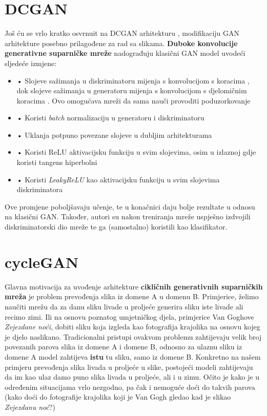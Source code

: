 \section{DCGAN}

Još ću se vrlo kratko osvrnuit na DCGAN arhitekturu \citep{dcgan}, modifikaciju GAN arhitekture posebno prilagođene za rad sa slikama. \textbf{Duboke konvolucije generativne suparničke mreže}  nadograđuju klasični GAN model uvodeći sljedeće izmjene:
\begin{itemize}
    \item {\large •} Slojeve sažimanja u diskriminatoru mijenja s konvolucijom s koracima , dok slojeve sažimanja u generatoru mijenja s konvolucijom s djelomičnim koracima . Ovo omogućava mreži da sama nauči provoditi poduzorkovanje
    \item {\large •} Koristi \textit{batch} normalizaciju u generatoru i diskriminatoru
    \item {\large •} Uklanja potpuno povezane slojeve u dubljim arhitekturama
    \item {\large •} Koristi ReLU aktivacijsku funkciju u svim slojevima, osim u izlaznoj gdje koristi tangens hiperbolni
    \item {\large •} Koristi \textit{LeakyReLU} kao aktivacijsku funkciju u svim slojevima diskriminatora
\end{itemize}

\noindent Ove promjene poboljšavaju učenje, te u konačnici daju bolje rezultate u odnosu na klasični GAN. Također, autori su nakon treniranja mreže uspješno izdvojili diskriminatorski dio mreže te ga (samostalno) koristili kao klasifikator.


\section{cycleGAN}
Glavna motivacija za uvođenje arhitekture \textbf{cikličnih generativnih suparničkih mreža}  je problem prevođenja slika iz domene A u domenu B. Primjerice, želimo naučiti mrežu da za danu sliku livade u proljeće generira sliku iste livade ali recimo zimi. Ili na osnovu poznatog umjetničkog djela, primjerice Van Goghove \textit{Zvjezdane noći}, dobiti sliku koja izgleda kao fotografija krajolika na osnovu kojeg je djelo naslikano. Tradicionalni pristupi ovakvom problemu zahtijevaju velik broj povezanih parova slika iz domene A i domene B, odnosno za ulaznu sliku iz domene A model zahtijeva \textbf{istu} tu sliku, samo iz domene B. Konkretno na našem primjeru prevođenja slika livada u proljeće u slike, postojeći modeli zahtijevaju da im kao ulaz damo puno slika livada u proljeće, ali i u zimu. Očito je kako je u određenim situacijama vrlo nezgodno, pa čak i nemoguće doći do takvih parova (kako doći do fotografije krajolika koji je Van Gogh gledao kad je slikao \textit{Zvjezdanu noć}?)

